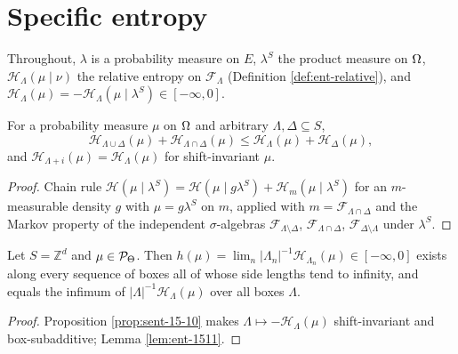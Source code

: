 \section{Specific entropy}

Throughout, $\lambda$ is a probability measure on $E$, $\lambda^S$ the product measure on
$\Omega$, $\mathcal H_\Lambda(\mu \mid \nu)$ the relative entropy on $\mathcal F_\Lambda$
(Definition \ref{def:ent-relative}), and $\mathcal H_\Lambda(\mu) = -\mathcal H_\Lambda(\mu \mid \lambda^S) \in [-\infty, 0]$.

\begin{proposition}[Georgii (15.10)]
    \label{prop:sent-15-10}
    \leanok

    For a probability measure $\mu$ on $\Omega$ and arbitrary $\Lambda, \Delta \subseteq S$,
    \[
        \mathcal H_{\Lambda \cup \Delta}(\mu) + \mathcal H_{\Lambda \cap \Delta}(\mu)
        \leq \mathcal H_\Lambda(\mu) + \mathcal H_\Delta(\mu),
    \]
    and $\mathcal H_{\Lambda + i}(\mu) = \mathcal H_\Lambda(\mu)$ for shift-invariant $\mu$.
\end{proposition}
\begin{proof}
    \leanok
    Chain rule $\mathcal H(\mu \mid \lambda^S) = \mathcal H(\mu \mid g\lambda^S) + \mathcal H_m(\mu \mid \lambda^S)$
    for an $m$-measurable density $g$ with $\mu = g\lambda^S$ on $m$, applied with
    $m = \mathcal F_{\Lambda \cap \Delta}$ and the Markov property of the independent
    $\sigma$-algebras $\mathcal F_{\Lambda \setminus \Delta}$, $\mathcal F_{\Lambda \cap \Delta}$,
    $\mathcal F_{\Delta \setminus \Lambda}$ under $\lambda^S$.
\end{proof}

\begin{theorem}
    \label{thm:sent-15-12}
    \leanok

    Let $S = \mathbb Z^d$ and $\mu \in \mathcal{P}_\Theta$. Then
    $h(\mu) = \lim_n |\Lambda_n|^{-1}\mathcal H_{\Lambda_n}(\mu) \in [-\infty, 0]$ exists along
    every sequence of boxes all of whose side lengths tend to infinity, and equals the infimum
    of $|\Lambda|^{-1}\mathcal H_\Lambda(\mu)$ over all boxes $\Lambda$.
\end{theorem}
\begin{proof}
    \leanok
    Proposition \ref{prop:sent-15-10} makes $\Lambda \mapsto -\mathcal H_\Lambda(\mu)$
    shift-invariant and box-subadditive; Lemma \ref{lem:ent-1511}.
\end{proof}

